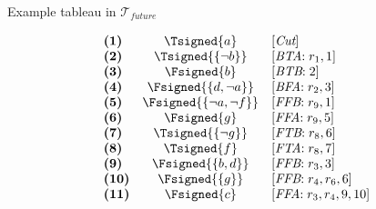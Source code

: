 \begin{frame}{Example tableau in $\mathcal{T}_{\textit{future}}$}
\TableauExampleProgram
\par
\bigskip
\begin{minipage}[t]{16cm}
\tiny
\begin{minipage}[t]{6cm}
\[
\begin{array}{lcl}
\textbf{(1)}                                       &
  \Tsigned{a}                                      &
  [\textit{Cut}]                                   \\
\textbf{(2)}                                       &
  \Tsigned{\{\neg b\}}                     &
  [\textit{BTA}{:}\; r_1, \text{1}]                \\
\textbf{(3)}                                       &
  \Fsigned{b}                                      &
  [\textit{BTB}{:}\; \text{2}]                     \\
\textbf{(4)}                                       &
  \Fsigned{\{d,\neg a\}}                   &
  [\textit{BFA}{:}\;r_2, \text{3}]                 \\
\textbf{(5)}                                       &
  \Fsigned{\{\neg a,\neg f\}}      &
  [\textit{FFB}{:}\;r_9, \text{1}]                 \\
\textbf{(6)}                                       &
  \Fsigned{g}                                      &
  [\textit{FFA}{:}\;r_9, \text{5}]                 \\
\textbf{(7)}                                       &
  \Tsigned{\{\neg g\}}                     &
  [\textit{FTB}{:}\;r_8, \text{6}]                 \\
\textbf{(8)}                                       &
  \Tsigned{f}                                      &
  [\textit{FTA}{:}\;r_8, \text{7}]                 \\
\textbf{(9)}                                       &
  \Fsigned{\{b,d\}}                                &
  [\textit{FFB}{:}\;r_3, \text{3}]                 \\
\textbf{(10)}                                      &
  \Fsigned{\{g\}}                                  &
  [\textit{FFB}{:}\;r_4, r_6, \text{6}]            \\
\textbf{(11)}                                      &
  \Fsigned{c}                                      &
  [\textit{FFA}{:}\;r_3,r_4, \text{9}, \text{10}]  \\

\end{array}\]
\end{minipage}
\end{minipage}
\end{frame}
